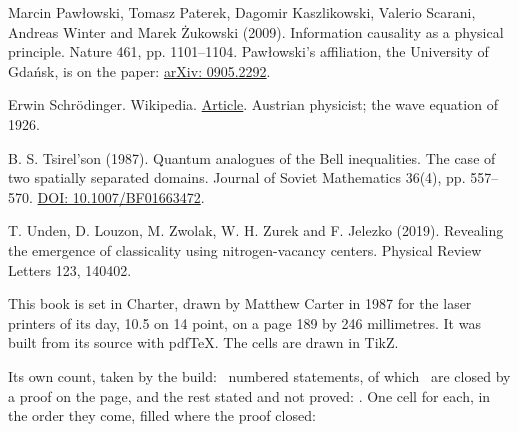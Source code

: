 \documentclass[11pt,twoside]{article}
\theoremstyle{thielethm}
\theoremstyle{thieledef}
\theoremstyle{thieledef}
\theoremstyle{thieledef}
\theoremstyle{thielethm}
\theoremstyle{thieleobs}
\theoremstyle{thielethm}
\begin{document}
\noindent Marcin Pawłowski, Tomasz Paterek, Dagomir Kaszlikowski, Valerio Scarani, Andreas Winter and Marek Żukowski (2009). Information causality as a physical principle. Nature 461, pp. 1101--1104. Pawłowski's affiliation, the University of Gdańsk, is on the paper: \href{https://arxiv.org/abs/0905.2292}{arXiv: 0905.2292}.
\par\medskip

\noindent Erwin Schrödinger. Wikipedia. \href{https://en.wikipedia.org/wiki/Erwin_Schr\%C3\%B6dinger}{Article}. Austrian physicist; the wave equation of 1926.
\par\medskip

\noindent B. S. Tsirel'son (1987). Quantum analogues of the Bell inequalities. The case of two spatially separated domains. Journal of Soviet Mathematics 36(4), pp. 557--570. \href{https://doi.org/10.1007/BF01663472}{DOI: 10.1007/BF01663472}.
\par\medskip

\noindent T. Unden, D. Louzon, M. Zwolak, W. H. Zurek and F. Jelezko (2019). Revealing the emergence of classicality using nitrogen-vacancy centers. Physical Review Letters 123, 140402.
\par\medskip

\cleardoublepage
\thispagestyle{empty}
\vspace*{154pt}
\begingroup\setlength{\parindent}{0pt}\setlength{\parskip}{7pt}
\noindent{}

\vspace{14pt}
This book is set in Charter, drawn by Matthew Carter in 1987 for the laser printers of its day,
10.5 on 14 point, on a page 189 by 246 millimetres. It was built from its source with pdfTeX.
The cells are drawn in TikZ.

Its own count, taken by the build: \ClaimTotal\ numbered statements, of which \PaidTotal\ are
closed by a proof on the page, and the rest stated and not proved: \OpenClaimList. One cell for
each, in the order they come, filled where the proof closed:

\vspace{7pt}
\noindent\LedgerGrid
\endgroup
\clearpage
\thispagestyle{empty}
\vspace*{0pt}
\noindent\BookLabel{\phantom{Devon Thiele}}

\vspace{14pt}
\PageCellFilled
\par\medskip
\end{document}
